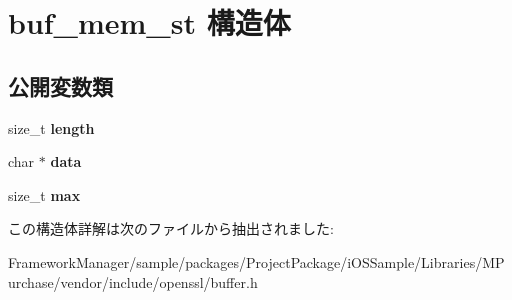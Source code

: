 \hypertarget{structbuf__mem__st}{}\section{buf\+\_\+mem\+\_\+st 構造体}
\label{structbuf__mem__st}
\subsection*{公開変数類}
\begin{DoxyCompactItemize}
\item 
\hypertarget{structbuf__mem__st_aa2bd5895b125d1b8f3ec5db5914abf21}{}size\+\_\+t {\bfseries length}\label{structbuf__mem__st_aa2bd5895b125d1b8f3ec5db5914abf21}

\item 
\hypertarget{structbuf__mem__st_aff3f0a4329a4dccdc9d08eaf4223e95c}{}char $\ast$ {\bfseries data}\label{structbuf__mem__st_aff3f0a4329a4dccdc9d08eaf4223e95c}

\item 
\hypertarget{structbuf__mem__st_a300f344aae77102e18dde58449b18ed3}{}size\+\_\+t {\bfseries max}\label{structbuf__mem__st_a300f344aae77102e18dde58449b18ed3}

\end{DoxyCompactItemize}


この構造体詳解は次のファイルから抽出されました\+:\begin{DoxyCompactItemize}
\item 
Framework\+Manager/sample/packages/\+Project\+Package/i\+O\+S\+Sample/\+Libraries/\+M\+Purchase/vendor/include/openssl/buffer.\+h\end{DoxyCompactItemize}
